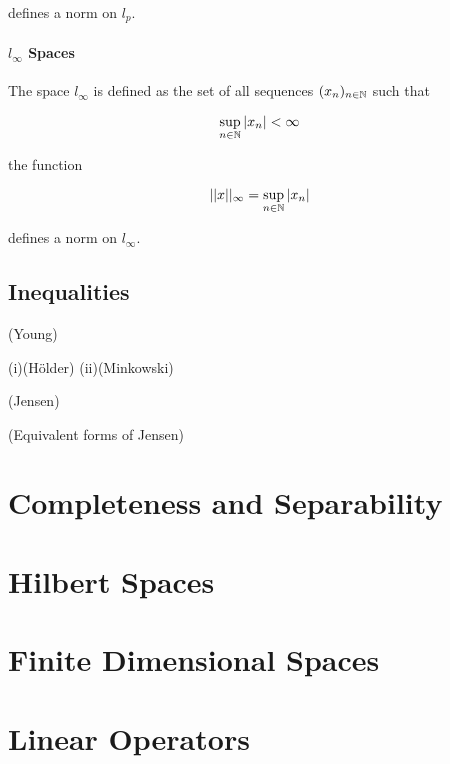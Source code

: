 \documentclass{article}
\begin{document}
defines a norm on $l_p$.  

\paragraph*{$l_\infty$ Spaces}  
The space $l_\infty$ is defined as the set of all sequences $(x_n)_{n\in \mathbb{N}}$ such that

\begin{equation*}
    \sup_{n\in \mathbb{N}} |x_n| < \infty
\end{equation*}

the function

\begin{equation*}
    ||x||_\infty = \sup_{n\in \mathbb{N}} |x_n|
\end{equation*}

defines a norm on $l_\infty$.

\subsection{Inequalities}

\begin{prop}
(Young)
\end{prop}

\begin{cor}
(i)(Hölder)
(ii)(Minkowski)
\end{cor}

\begin{prop}
(Jensen)
\end{prop}

\begin{prop}
(Equivalent forms of Jensen)
\end{prop}  

\section{Completeness and Separability}  

\section{Hilbert Spaces}  

\section{Finite Dimensional Spaces}  

\section{Linear Operators}  
\end{document}
